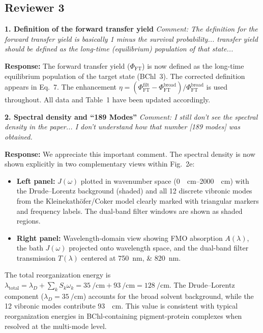 \documentclass[11pt]{article}
\begin{document}
\subsection*{Reviewer 3}

\textbf{1. Definition of the forward transfer yield}
\textit{Comment: The definition for the forward transfer yield is basically 1 minus the survival probability... transfer yield should be defined as the long-time (equilibrium) population of that state...}

\textbf{Response:} The forward transfer yield ($\Phi_{\mathrm{FT}}$) is now defined as the long-time equilibrium population of the target state (BChl~3). The corrected definition appears in Eq.~7. The enhancement $\eta = (\Phi_{\mathrm{FT}}^{\mathrm{filt}} - \Phi_{\mathrm{FT}}^{\mathrm{broad}})/\Phi_{\mathrm{FT}}^{\mathrm{broad}}$ is used throughout. All data and Table~1 have been updated accordingly.

\textbf{2. Spectral density and ``189 Modes''}
\textit{Comment: I still don't see the spectral density in the paper... I don't understand how that number [189 modes] was obtained.}

\textbf{Response:} We appreciate this important comment. The spectral density is now shown explicitly in two complementary views within Fig.~2e:
\begin{itemize}
    \item \textbf{Left panel:} $J(\omega)$ plotted in wavenumber space (\SIrange{0}{2000}{\per\centi\meter}) with the Drude--Lorentz background (shaded) and all \num{12} discrete vibronic modes from the Kleinekath\"{o}fer/Coker model clearly marked with triangular markers and frequency labels. The dual-band filter windows are shown as shaded regions.
    \item \textbf{Right panel:} Wavelength-domain view showing FMO absorption $A(\lambda)$, the bath $J(\omega)$ projected onto wavelength space, and the dual-band filter transmission $T(\lambda)$ centered at \SIlist{750;820}{\nano\meter}.
\end{itemize}
The total reorganization energy is $\lambda_{\mathrm{total}} = \lambda_D + \sum_k S_k \omega_k = \SI{35}{\per\centi\meter} + \SI{93}{\per\centi\meter} = \SI{128}{\per\centi\meter}$. The Drude--Lorentz component ($\lambda_D = \SI{35}{\per\centi\meter}$) accounts for the broad solvent background, while the \num{12} vibronic modes contribute \SI{93}{\per\centi\meter}. This value is consistent with typical reorganization energies in BChl-containing pigment-protein complexes when resolved at the multi-mode level.
\end{document}
